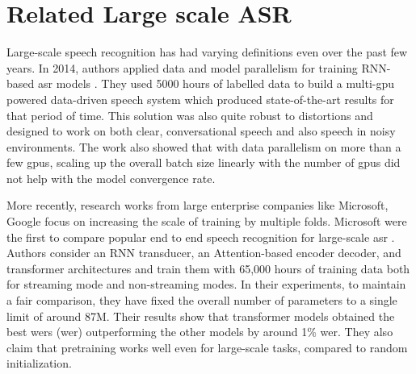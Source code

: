 \section{Related Large scale ASR}
\label{section:largescale_related}
Large-scale speech recognition has had varying definitions even over the past few years. In 2014, authors applied data and model parallelism for training RNN-based \acrshort{asr} models \cite{Hannun2014DeepRecognition}. They used 5000 hours of labelled data to build a multi-\acrshort{gpu} powered data-driven speech system which produced state-of-the-art results for that period of time. This solution was also quite robust to distortions and designed to work on both clear, conversational speech and also speech in noisy environments. The work also showed that with data parallelism on more than a few \acrshort{gpu}s, scaling up the overall batch size linearly with the number of \acrshort{gpu}s did not help with the model convergence rate.

More recently, research works from large enterprise companies like Microsoft, Google focus on increasing the scale of training by multiple folds. Microsoft were the first to compare popular end to end speech recognition for large-scale \acrshort{asr} \cite{Li2020OnRecognition}. Authors consider an RNN transducer, an Attention-based encoder decoder, and transformer architectures and train them with 65,000 hours of training data both for streaming mode and non-streaming modes. In their experiments, to maintain a fair comparison, they have fixed the overall number of parameters to a single limit of around 87M. Their results show that transformer models obtained the best \acrlong{wer}s (\acrshort{wer}) outperforming the other models by around 1\% \acrshort{wer}. They also claim that pretraining works well even for large-scale tasks, compared to random initialization.

